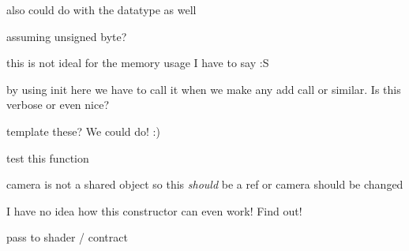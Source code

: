 \begin{DoxyRefList}
also could do with the datatype as well  
\item[\label{todo__todo000005}%
\hypertarget{todo__todo000005}{}%
Member \hyperlink{classs9_1_1gl_1_1TextureStream_af480e3b1df190227d46215955824dcc0}{s9\-:\-:gl\-:\-:Texture\-Stream\-:\-:Texture\-Stream} (size\-\_\-t width, size\-\_\-t height, Colour\-Component format=R\-G\-B, Colour\-Type type=U\-N\-S\-I\-G\-N\-E\-D\-\_\-\-B\-Y\-T\-E, const byte\-\_\-t $\ast$data=nullptr)]assuming unsigned byte?  
\item[\label{todo__todo000006}%
\hypertarget{todo__todo000006}{}%
Member \hyperlink{classs9_1_1MD5Model_ae66dbcad9ce47515274dd0d31c58685f}{s9\-:\-:M\-D5\-Model\-:\-:parse} (const \hyperlink{classs9_1_1File}{s9\-::\-File} \&file)]this is not ideal for the memory usage I have to say \-:S  
\item[\label{todo__todo000009}%
\hypertarget{todo__todo000009}{}%
Member \hyperlink{classs9_1_1Node_ab5541e36644656e95fcd214dd47147f9}{s9\-:\-:Node\-:\-:\-\_\-init} ()]by using init here we have to call it when we make any add call or similar. Is this verbose or even nice?  
\item[\label{todo__todo000032}%
\hypertarget{todo__todo000032}{}%
Member \hyperlink{classs9_1_1Node_ac44580d62b43ded65eca763eb380eb9c}{s9\-:\-:Node\-:\-:add} (Shape \&s)]template these? We could do! \-:)  
\item[\label{todo__todo000010}%
\hypertarget{todo__todo000010}{}%
Member \hyperlink{classs9_1_1Node_af7943a5ef0029e3fcfdd63ef5c573ffc}{s9\-:\-:Node\-:\-:remove\-Child} (Node p)]test this function  
\item[\label{todo__todo000030}%
\hypertarget{todo__todo000030}{}%
Class \hyperlink{classs9_1_1NodeCamera}{s9\-:\-:Node\-Camera} ]camera is not a shared object so this {\itshape should} be a ref or camera should be changed  
\item[\label{todo__todo000031}%
\hypertarget{todo__todo000031}{}%
Member \hyperlink{classs9_1_1NodeMinimal_a80572ab845ddfd90f879333f4020d67e}{s9\-:\-:Node\-Minimal\-:\-:Node\-Minimal} ()]I have no idea how this constructor can even work! Find out!  
\item[\label{todo__todo000007}%
\hypertarget{todo__todo000007}{}%
Member \hyperlink{classs9_1_1NodeShape_a73adf5ca86fc1aee2d4f1d4ce8c5f411}{s9\-:\-:Node\-Shape\-:\-:draw} ()]pass to shader / contract 


\end{DoxyRefList}
